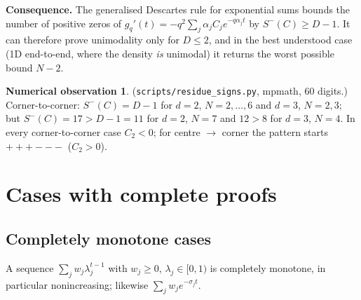 \documentclass[11pt,a4paper]{article}
\theoremstyle{definition}
\newtheorem{observation}[theorem]{Numerical observation}
\newcommand{\Sm}{S^{-}}
\begin{document}
\textbf{Consequence.} The generalised Descartes rule for exponential sums bounds the number of positive zeros of $g_q'(t)=-q^2\sum_j\alpha_jC_je^{-q\alpha_jt}$ by $\Sm(C)\ge D-1$. It can therefore prove unimodality only for $D\le2$, and in the best understood case (1D end-to-end, where the density \emph{is} unimodal) it returns the worst possible bound $N-2$.

\begin{observation}\label{obs:res}
(\texttt{scripts/residue\_signs.py}, mpmath, 60 digits.) Corner-to-corner: $\Sm(C)=D-1$ for $d=2$, $N=2,\dots,6$ and $d=3$, $N=2,3$; but $\Sm(C)=17>D-1=11$ for $d=2$, $N=7$ and $12>8$ for $d=3$, $N=4$. In every corner-to-corner case $C_2<0$; for centre $\to$ corner the pattern starts $+++---$ ($C_2>0$).
\end{observation}

\section{Cases with complete proofs}\label{sec:proved}

\subsection{Completely monotone cases}
A sequence $\sum_jw_j\lambda_j^{t-1}$ with $w_j\ge0$, $\lambda_j\in[0,1)$ is completely monotone, in particular nonincreasing; likewise $\sum_jw_je^{-\sigma_jt}$.
\end{document}
